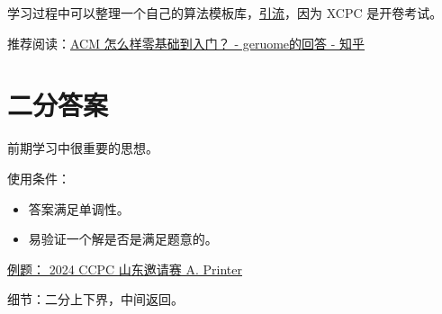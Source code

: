 \documentclass{ctexart}
\begin{document}
学习过程中可以整理一个自己的算法模板库，\href{https://github.com/nephrenn233/Templates-in-Competitive-Programming}{引流}，因为 XCPC 是开卷考试。

推荐阅读：\href{https://www.zhihu.com/question/26823471/answer/2423361138}{ACM 怎么样零基础到入门？ - geruome的回答 - 知乎}

\section{二分答案}
前期学习中很重要的思想。

使用条件：
\begin{itemize}
    \item 答案满足单调性。
    \item 易验证一个解是否是满足题意的。
\end{itemize}

\href{https://codeforces.com/gym/105385/problem/A}{例题： 2024 CCPC 山东邀请赛 A. Printer}

细节：二分上下界，中间返回。
\end{document}
